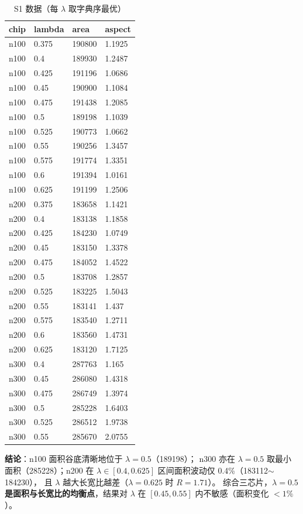 \documentclass[12pt,a4paper]{article}
\begin{document}
  \begin{table}[H]
  \centering
  \caption{S1 数据（每 $\lambda$ 取字典序最优）}\label{tab:q1s1}
  \begin{tabular}{llll}
  \toprule
  chip & lambda & area & aspect \\
  \midrule
  n100 & 0.375 & 190800 & 1.1925 \\
  n100 & 0.4 & 189930 & 1.2487 \\
  n100 & 0.425 & 191196 & 1.0686 \\
  n100 & 0.45 & 190900 & 1.1084 \\
  n100 & 0.475 & 191438 & 1.2085 \\
  n100 & 0.5 & 189198 & 1.1039 \\
  n100 & 0.525 & 190773 & 1.0662 \\
  n100 & 0.55 & 190256 & 1.3457 \\
  n100 & 0.575 & 191774 & 1.3351 \\
  n100 & 0.6 & 191394 & 1.0161 \\
  n100 & 0.625 & 191199 & 1.2506 \\
  n200 & 0.375 & 183658 & 1.1421 \\
  n200 & 0.4 & 183138 & 1.1858 \\
  n200 & 0.425 & 184230 & 1.0749 \\
  n200 & 0.45 & 183150 & 1.3378 \\
  n200 & 0.475 & 184052 & 1.4522 \\
  n200 & 0.5 & 183708 & 1.2857 \\
  n200 & 0.525 & 183225 & 1.5043 \\
  n200 & 0.55 & 183141 & 1.437 \\
  n200 & 0.575 & 183540 & 1.2711 \\
  n200 & 0.6 & 183560 & 1.4731 \\
  n200 & 0.625 & 183120 & 1.7125 \\
  n300 & 0.4 & 287763 & 1.165 \\
  n300 & 0.45 & 286080 & 1.4318 \\
  n300 & 0.475 & 286749 & 1.3974 \\
  n300 & 0.5 & 285228 & 1.6403 \\
  n300 & 0.525 & 286512 & 1.9738 \\
  n300 & 0.55 & 285670 & 2.0755 \\
  \bottomrule
  \end{tabular}
  \end{table}

\textbf{结论}：n100 面积谷底清晰地位于 $\lambda = 0.5$（189198）；
n300 亦在 $\lambda = 0.5$ 取最小面积（285228）；n200 在
$\lambda \in [0.4, 0.625]$ 区间面积波动仅 0.4\%（183112$\sim$184230），
且 $\lambda$ 越大长宽比越差（$\lambda=0.625$ 时 $R=1.71$）。
综合三芯片，\textbf{$\lambda = 0.5$ 是面积与长宽比的均衡点}，结果对
$\lambda$ 在 $[0.45, 0.55]$ 内不敏感（面积变化 $<1\%$）。
\end{document}
